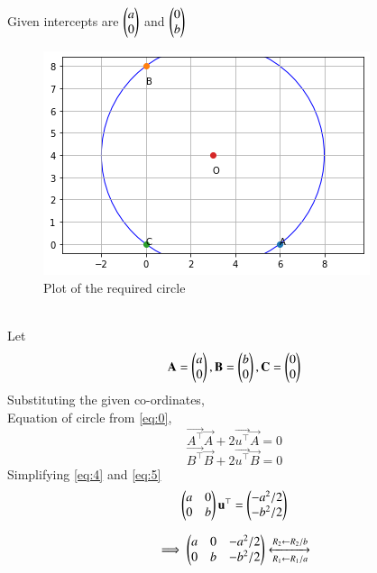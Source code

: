 \documentclass[journal,12pt,twocolumn]{IEEEtran}
\begin{document}
Given intercepts are $\begin{pmatrix}a\\0\end{pmatrix}$ and $\begin{pmatrix}0\\b\end{pmatrix}$ \\
\begin{figure}[!h]
         \centering
         \includegraphics[width=\columnwidth]{figure3.png}
         \caption{Plot of the required circle}
         \label{Figure}
\end{figure}\\

Let 
\begin{equation}
 \mathbf{A}=\begin{pmatrix}a\\0\end{pmatrix} ,\\
 \mathbf{B}=\begin{pmatrix}b\\0\end{pmatrix},\\
 \mathbf{C}=\begin{pmatrix}0\\0\end{pmatrix}
\end{equation}
Substituting the given co-ordinates,\\
Equation of circle from \ref{eq:0},
\begin{equation}
    \vec{A^\top}\vec{A}+2\vec{u^\top}\vec{A}=0 \label{eq:4}
\end{equation}
\begin{equation}
    \vec{B^\top}\vec{B}+2\vec{u^\top}\vec{B}=0 \label{eq:5}
\end{equation}
Simplifying \ref{eq:4} and \ref{eq:5}
\begin{equation}
    \begin{pmatrix}a & 0 \\ 0 & b\end{pmatrix}\mathbf{u^\top}= \begin{pmatrix}-a^2/2 \\ -b^2/2\end{pmatrix}
\end{equation}

\begin{equation}
\implies \begin{pmatrix}a & 0 & -a^2/2 \\ 0 & b & -b^2/2\end{pmatrix}
\xleftrightarrow [R_1\leftarrow R_1/a]{R_2\leftarrow R_2/b}
\end{equation}
\end{document}

